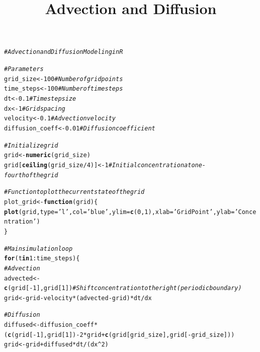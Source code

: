 \documentclass{tufte-handout}\usepackage[]{graphicx}\usepackage[]{xcolor}
\title{Advection and Diffusion}
\makeatletter
\newcommand{\hlnum}[1]{\textcolor[rgb]{0.686,0.059,0.569}{#1}}%
\newcommand{\hlstr}[1]{\textcolor[rgb]{0.192,0.494,0.8}{#1}}%
\newcommand{\hlcom}[1]{\textcolor[rgb]{0.678,0.584,0.686}{\textit{#1}}}%
\newcommand{\hlopt}[1]{\textcolor[rgb]{0,0,0}{#1}}%
\newcommand{\hlstd}[1]{\textcolor[rgb]{0.345,0.345,0.345}{#1}}%
\newcommand{\hlkwa}[1]{\textcolor[rgb]{0.161,0.373,0.58}{\textbf{#1}}}%
\newcommand{\hlkwb}[1]{\textcolor[rgb]{0.69,0.353,0.396}{#1}}%
\newcommand{\hlkwc}[1]{\textcolor[rgb]{0.333,0.667,0.333}{#1}}%
\newcommand{\hlkwd}[1]{\textcolor[rgb]{0.737,0.353,0.396}{\textbf{#1}}}%
\newenvironment{kframe}{%
 \def\at@end@of@kframe{}%
 \ifinner\ifhmode%
  \def\at@end@of@kframe{\end{minipage}}%
  \begin{minipage}{\columnwidth}%
 \fi\fi%
 \def\FrameCommand##1{\hskip\@totalleftmargin \hskip-\fboxsep
 \colorbox{shadecolor}{##1}\hskip-\fboxsep
     \hskip-\linewidth \hskip-\@totalleftmargin \hskip\columnwidth}%
 \MakeFramed {\advance\hsize-\width
   \@totalleftmargin\z@ \linewidth\hsize
   \@setminipage}}%
 {\par\unskip\endMakeFramed%
 \at@end@of@kframe}
\newenvironment{knitrout}{}{} %
\makeatother
\begin{document}
\maketitle

\begin{knitrout}
\color{fgcolor}\begin{kframe}
\begin{alltt}
\hlcom{# Advection and Diffusion Modeling in R}

\hlcom{# Parameters}
\hlstd{grid_size} \hlkwb{<-} \hlnum{100}   \hlcom{# Number of grid points}
\hlstd{time_steps} \hlkwb{<-} \hlnum{100}  \hlcom{# Number of time steps}
\hlstd{dt} \hlkwb{<-} \hlnum{0.1}          \hlcom{# Time step size}
\hlstd{dx} \hlkwb{<-} \hlnum{1}            \hlcom{# Grid spacing}
\hlstd{velocity} \hlkwb{<-} \hlnum{0.1}    \hlcom{# Advection velocity}
\hlstd{diffusion_coeff} \hlkwb{<-} \hlnum{0.01}  \hlcom{# Diffusion coefficient}

\hlcom{# Initialize grid}
\hlstd{grid} \hlkwb{<-} \hlkwd{numeric}\hlstd{(grid_size)}
\hlstd{grid[}\hlkwd{ceiling}\hlstd{(grid_size} \hlopt{/} \hlnum{4}\hlstd{)]} \hlkwb{<-} \hlnum{1}  \hlcom{# Initial concentration at one-fourth of the grid}

\hlcom{# Function to plot the current state of the grid}
\hlstd{plot_grid} \hlkwb{<-} \hlkwa{function}\hlstd{(}\hlkwc{grid}\hlstd{) \{}
  \hlkwd{plot}\hlstd{(grid,} \hlkwc{type} \hlstd{=} \hlstr{'l'}\hlstd{,} \hlkwc{col} \hlstd{=} \hlstr{'blue'}\hlstd{,} \hlkwc{ylim} \hlstd{=} \hlkwd{c}\hlstd{(}\hlnum{0}\hlstd{,} \hlnum{1}\hlstd{),} \hlkwc{xlab} \hlstd{=} \hlstr{'Grid Point'}\hlstd{,} \hlkwc{ylab} \hlstd{=} \hlstr{'Concentration'}\hlstd{)}
\hlstd{\}}

\hlcom{# Main simulation loop}
\hlkwa{for} \hlstd{(t} \hlkwa{in} \hlnum{1}\hlopt{:}\hlstd{time_steps) \{}
  \hlcom{# Advection}
  \hlstd{advected} \hlkwb{<-} \hlkwd{c}\hlstd{(grid[}\hlopt{-}\hlnum{1}\hlstd{], grid[}\hlnum{1}\hlstd{])}  \hlcom{# Shift concentration to the right (periodic boundary)}
  \hlstd{grid} \hlkwb{<-} \hlstd{grid} \hlopt{-} \hlstd{velocity} \hlopt{*} \hlstd{(advected} \hlopt{-} \hlstd{grid)} \hlopt{*} \hlstd{dt} \hlopt{/} \hlstd{dx}

  \hlcom{# Diffusion}
  \hlstd{diffused} \hlkwb{<-} \hlstd{diffusion_coeff} \hlopt{*} \hlstd{(}\hlkwd{c}\hlstd{(grid[}\hlopt{-}\hlnum{1}\hlstd{], grid[}\hlnum{1}\hlstd{])} \hlopt{-} \hlnum{2} \hlopt{*} \hlstd{grid} \hlopt{+} \hlkwd{c}\hlstd{(grid[grid_size], grid[}\hlopt{-}\hlstd{grid_size]))}
  \hlstd{grid} \hlkwb{<-} \hlstd{grid} \hlopt{+} \hlstd{diffused} \hlopt{*} \hlstd{dt} \hlopt{/} \hlstd{(dx}\hlopt{^}\hlnum{2}\hlstd{)}


\end{alltt}
\end{kframe}
\end{knitrout}
\end{document}
